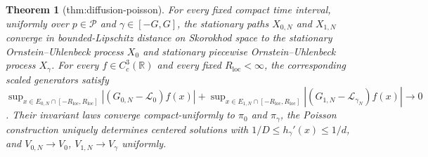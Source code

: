\documentclass{article}
\newtheorem{theorem}{Theorem}
\begin{document}
\begin{theorem}[thm:diffusion-poisson]\label{thm:diffusion-poisson}
For every fixed compact time interval, uniformly over \(p\in\mathcal P\) and \(\gamma\in[-G,G]\), the stationary paths \(X_{0,N}\) and \(X_{1,N}\) converge in bounded-Lipschitz distance on Skorokhod space to the stationary Ornstein--Uhlenbeck process \(X_0\) and stationary piecewise Ornstein--Uhlenbeck process \(X_\gamma\). For every \(f\in C_c^3(\mathbb R)\) and every fixed \(R_{\mathrm{loc}}<\infty\), the corresponding scaled generators satisfy \(\sup_{x\in E_{0,N}\cap[-R_{\mathrm{loc}},R_{\mathrm{loc}}]}|(G_{0,N}-\mathcal L_0)f(x)|+\sup_{x\in E_{1,N}\cap[-R_{\mathrm{loc}},R_{\mathrm{loc}}]}|(G_{1,N}-\mathcal L_{\gamma_N})f(x)|\to0\). Their invariant laws converge compact-uniformly to \(\pi_0\) and \(\pi_\gamma\), the Poisson construction uniquely determines centered solutions with \(1/D\le h_\gamma'(x)\le1/d\), and \(V_{0,N}\to V_0\), \(V_{1,N}\to V_\gamma\) uniformly.
\end{theorem}
\end{document}
